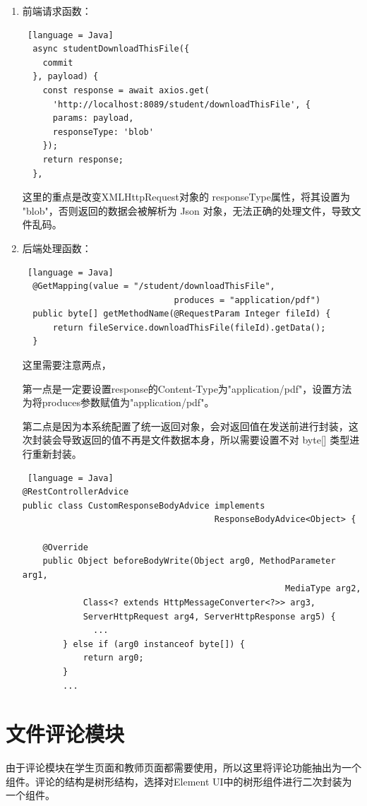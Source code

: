 \begin{enumerate}
  \item 前端请求函数：
        \begin{lstlisting} [language = Java]
  async studentDownloadThisFile({
    commit
  }, payload) {
    const response = await axios.get(
      'http://localhost:8089/student/downloadThisFile', {
      params: payload,
      responseType: 'blob'
    });
    return response;
  },
  \end{lstlisting}
        这里的重点是改变XMLHttpRequest对象的 responseType属性，将其设置为 "blob"，否则返回的数据会被解析为 Json 对象，无法正确的处理文件，导致文件乱码。
  \item 后端处理函数：
        \begin{lstlisting} [language = Java]
  @GetMapping(value = "/student/downloadThisFile", 
                              produces = "application/pdf")
  public byte[] getMethodName(@RequestParam Integer fileId) {
      return fileService.downloadThisFile(fileId).getData();
  }
  \end{lstlisting}
        这里需要注意两点，

        第一点是一定要设置response的Content-Type为"application/pdf"，设置方法为将produces参数赋值为"application/pdf"。

        第二点是因为本系统配置了统一返回对象，会对返回值在发送前进行封装，这次封装会导致返回的值不再是文件数据本身，所以需要设置不对 byte[] 类型进行重新封装。
        \begin{lstlisting} [language = Java]
@RestControllerAdvice
public class CustomResponseBodyAdvice implements 
                                      ResponseBodyAdvice<Object> {

    @Override
    public Object beforeBodyWrite(Object arg0, MethodParameter arg1, 
                                                    MediaType arg2,
            Class<? extends HttpMessageConverter<?>> arg3, 
            ServerHttpRequest arg4, ServerHttpResponse arg5) {
              ...
        } else if (arg0 instanceof byte[]) {
            return arg0;
        }
        ...
\end{lstlisting}
\end{enumerate}

\section{文件评论模块}

由于评论模块在学生页面和教师页面都需要使用，所以这里将评论功能抽出为一个组件。评论的结构是树形结构，选择对Element UI中的树形组件进行二次封装为一个组件。

